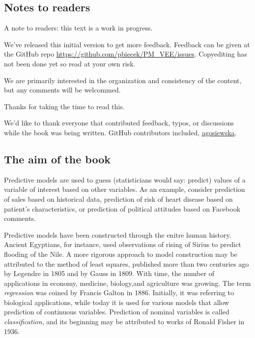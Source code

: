 \documentclass[12pt,]{krantz}
\theoremstyle{definition}
\theoremstyle{definition}
\theoremstyle{definition}
\theoremstyle{remark}
\begin{document}
\hypertarget{notes-to-readers}{%
\subsection{Notes to readers}\label{notes-to-readers}}

A note to readers: this text is a work in progress.

We've released this initial version to get more feedback. Feedback can
be given at the GitHub repo
\url{https://github.com/pbiecek/PM_VEE/issues}. Copyediting has not been
done yet so read at your own risk.

We are primarily interested in the organization and consistency of the
content, but any comments will be welcommed.

Thanks for taking the time to read this.

We'd like to thank everyone that contributed feedback, typos, or
discussions while the book was being written. GitHub contributors
included, \href{https://github.com/agosiewska/}{agosiewska}.

\hypertarget{the-aim-of-the-book}{%
\subsection{The aim of the book}\label{the-aim-of-the-book}}

Predictive models are used to guess (statisticians would say: predict)
values of a variable of interest based on other variables. As an
example, consider prediction of sales based on historical data,
prediction of risk of heart disease based on patient's characteristics,
or prediction of political attitudes based on Facebook comments.

Predictive models have been constructed through the enitre human
history. Ancient Egyptians, for instance, used observations of rising of
Sirius to predict flooding of the Nile. A more rigorous approach to
model construction may be attributed to the method of least squares,
published more than two centuries ago by Legendre in 1805 and by Gauss
in 1809. With time, the number of applications in economy, medicine,
biology,and agriculture was growing. The term \emph{regression} was
coined by Francis Galton in 1886. Initially, it was referring to
biological applications, while today it is used for various models that
allow prediction of continuous variables. Prediction of nominal
variables is called \emph{classification}, and its beginning may be
attributed to works of Ronald Fisher in 1936.
\end{document}
